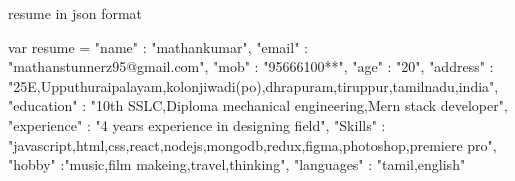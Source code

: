 resume in json format

var resume = {
    "name" : "mathankumar",
    "email" : "mathanstunnerz95@gmail.com",
    "mob" : "95666100**",
    "age" : "20",
    "address" : "25E,Upputhuraipalayam,kolonjiwadi(po),dhrapuram,tiruppur,tamilnadu,india",
    "education" : "10th SSLC,Diploma mechanical engineering,Mern stack developer",
    "experience" : "4 years experience in designing field",
    "Skills" : "javascript,html,css,react,nodejs,mongodb,redux,figma,photoshop,premiere pro",
    "hobby" :"music,film makeing,travel,thinking",
    "languages" : "tamil,english"
}